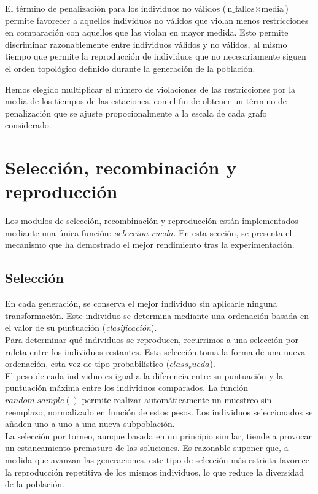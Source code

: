 \documentclass[12pt]{report}
\begin{document}
El término de penalización para los individuos no válidos (\(\text{n\_fallos} \times \text{media}\)) permite favorecer a aquellos individuos no válidos que violan menos restricciones en comparación con aquellos que las violan en mayor medida. Esto permite discriminar razonablemente entre individuos válidos y no válidos, al mismo tiempo que permite la reproducción de individuos que no necesariamente siguen el orden topológico definido durante la generación de la población.

Hemos elegido multiplicar el número de violaciones de las restricciones por la media de los tiempos de las estaciones, con el fin de obtener un término de penalización que se ajuste propocionalmente a la escala de cada grafo considerado.

\section{Selección, recombinación y reproducción}

Los modulos de selección, recombinación y reproducción están implementados mediante una única función: $seleccion\_rueda$. En esta sección, se presenta el mecanismo que ha demostrado el mejor rendimiento tras la experimentación.
\\

\subsection{Selección}

En cada generación, se conserva el mejor individuo sin aplicarle ninguna transformación. Este individuo se determina mediante una ordenación basada en el valor de su puntuación (\textit{clasificación}).\\

Para determinar qué individuos se reproducen, recurrimos a una selección por ruleta entre los individuos restantes. Esta selección toma la forma de una nueva ordenación, esta vez de tipo probabilístico ($class_rueda$).\\
El peso de cada individuo es igual a la diferencia entre su puntuación y la puntuación máxima entre los individuos comparados. La función $random.sample()$ permite realizar automáticamente un muestreo sin reemplazo, normalizado en función de estos pesos. Los individuos seleccionados se añaden uno a uno a una nueva subpoblación.\\

La selección por torneo, aunque basada en un principio similar, tiende a provocar un estancamiento prematuro de las soluciones. Es razonable suponer que, a medida que avanzan las generaciones, este tipo de selección más estricta favorece la reproducción repetitiva de los mismos individuos, lo que reduce la diversidad de la población.
\end{document}
